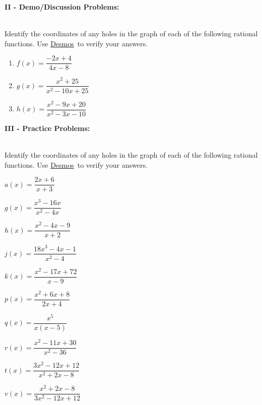 \documentclass[12pt]{article}
\theoremstyle{definition}
\newcommand{\Desmos}{\href{https://www.desmos.com/}{Desmos}}
\begin{document}
{\bf II - Demo/Discussion Problems:}\\
\ \par
Identify the coordinates of any holes in the graph of each of the following rational functions.  Use \Desmos \ to verify your answers.
\begin{enumerate}
 \item $f(x)=\dfrac{-2x+4}{4x-8}$
 \item $g(x)=\dfrac{x^2+25}{x^2-10x+25}$
 \item $h(x)=\dfrac{x^2-9x+20}{x^2-3x-10}$
\end{enumerate}
{\bf III - Practice Problems:}\\
\ \par
Identify the coordinates of any holes in the graph of each of the following rational functions.  Use \Desmos \ to verify your answers.
\begin{enumerate}
\begin{multicols}{3}
\item $a(x)=\dfrac{2x+6}{x+3}$
\item $g(x)=\dfrac{x^3-16x}{x^2-4x}$
\item $h(x)=\dfrac{x^2-4x-9}{x+2}$
\item $j(x)=\dfrac{18x^3-4x-1}{x^2-4}$
\item $k(x)=\dfrac{x^2-17x+72}{x-9}$
\item $p(x)=\dfrac{x^2+6x+8}{2x+4}$
\item $q(x)=\dfrac{x^5}{x(x-5)}$
\item $r(x)=\dfrac{x^2-11x+30}{x^2-36}$
\item $t(x)=\dfrac{3x^2-12x+12}{x^2+2x-8}$
\item $v(x)=\dfrac{x^2+2x-8} {3x^2-12x+12}$
\end{multicols}
\end{enumerate}
\newpage
\end{document}
